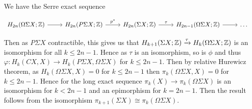 \documentclass[10pt,a4paper]{article}
\begin{document}
\begin{enumerate}
We have the Serre exact sequence

\[\begin{tikzcd}
H_{2n}(\Omega\Sigma X;\Z) \arrow{r} & H_{2n}(P\Sigma X;\Z) \arrow[r,"p^*"] & H_{2n}(\Sigma X;\Z) \arrow[r,"\tau"] & H_{2n-1}(\Omega \Sigma X;\Z)\arrow{r} & \ldots
\end{tikzcd}\]


Then as $P\Sigma X$ contractible, this gives us that $H_{k+1}(\Sigma X;\mathbb{Z}) \xrightarrow{\tau} H_{k}(\Omega \Sigma X;\mathbb{Z})$ is an isomorphism for all $k\leq 2n-1$. Hence as $\tau$ is an isomorphism, so is $\phi$ and thus $\varphi:H_k(CX,X)\to H_k(P\Sigma X, \Omega \Sigma X)$ for $k\leq 2n-1$. Then by relative Hurewicz theorem, as $H_k(\Omega \Sigma X,X)=0$ for $k\leq 2n-1$ then $\pi_k(\Omega \Sigma X,X) =0$ for $k\leq 2n-1$. Hence for the long exact sequence $\pi_k(X)\to \pi_k(\Omega \Sigma X)$ is an isomorphism for $k<2n-1$ and an epimorphism for $k=2n-1$. Then the result follows from the isomorphism $\pi_{k+1}(\Sigma X) \cong \pi_k(\Omega \Sigma X)$.
\end{enumerate}
\end{document}
